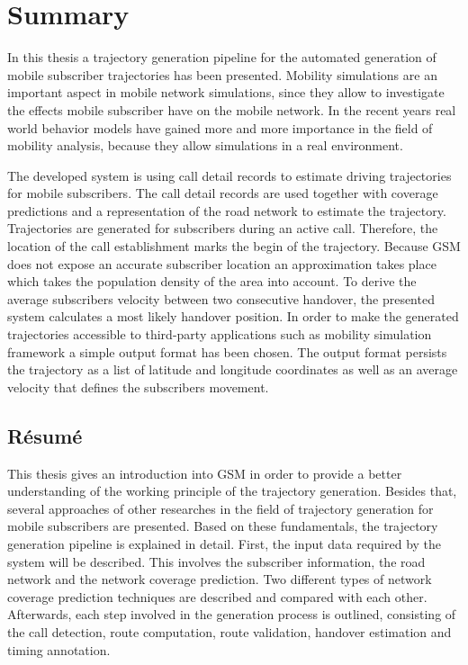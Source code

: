\chapter{Summary}
In this thesis a trajectory generation pipeline for the automated generation of mobile subscriber trajectories has been presented. Mobility simulations are an important aspect in mobile network simulations, since they allow to investigate the effects mobile subscriber have on the mobile network. In the recent years real world behavior models have gained more and more importance in the field of mobility analysis, because they allow simulations in a real environment.

The developed system is using call detail records to estimate driving trajectories for mobile subscribers. The call detail records are used together with coverage predictions and a representation of the road network to estimate the trajectory.
Trajectories are generated for subscribers during an active call. Therefore, the location of the call establishment marks the begin of the trajectory. Because GSM does not expose an accurate subscriber location an approximation takes place which takes the population density of the area into account.
To derive the average subscribers velocity between two consecutive handover, the presented system calculates a most likely handover position. In order to make the generated trajectories accessible to third-party applications such as mobility simulation framework a simple output format has been chosen. The output format persists the trajectory as a list of latitude and longitude coordinates as well as an average velocity that defines the subscribers movement.
\section{Résumé}
This thesis gives an introduction into GSM in order to provide a better understanding of the working principle of the trajectory generation. Besides that, several approaches of other researches in the field of trajectory generation for mobile subscribers are presented.
Based on these fundamentals, the trajectory generation pipeline is explained in detail. First, the input data required by the system will be described. This involves the subscriber information, the road network and the network coverage prediction. Two different types of network coverage prediction techniques are described and compared with each other. Afterwards, each step involved in the generation process is outlined, consisting of the call detection, route computation, route validation, handover estimation and timing annotation.   
